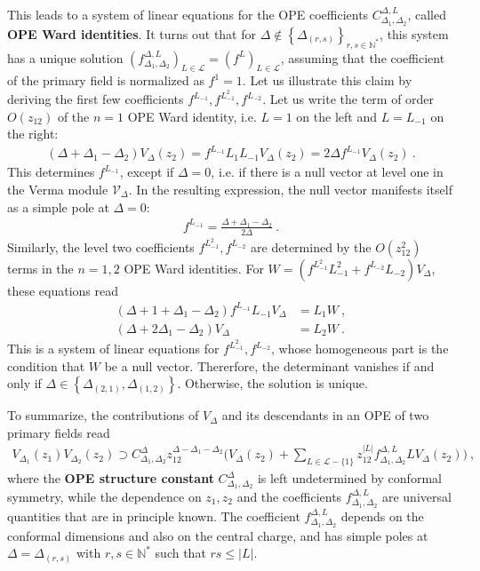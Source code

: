\documentclass[12pt, a4paper]{article}
\theoremstyle{break}
\begin{document}
This leads to a system of linear equations for the OPE coefficients $C^{\Delta,L}_{\Delta_1,\Delta_2}$, called \textbf{OPE Ward identities}. It turns out that for $\Delta\notin \left\{\Delta_{(r,s)}\right\}_{r,s\in\mathbb{N}^*}$, this system has a unique solution $\left(f^{\Delta,L}_{\Delta_1,\Delta_2}\right)_{L\in\mathcal{L}}=\left(f^L\right)_{L\in\mathcal{L}}$, assuming that the coefficient of the primary field is normalized as
$f^{1}=1$. Let us illustrate this claim by deriving the first few coefficients $f^{L_{-1}},f^{L_{-1}^2},f^{L_{-2}}$. Let us write the term of order $O(z_{12})$ of the $n=1$ OPE Ward identity, i.e. $L=1$ on the left and $L=L_{-1}$ on the right:
\begin{align}
 (\Delta+\Delta_1-\Delta_2)V_\Delta(z_2) = f^{L_{-1}} L_1L_{-1}V_\Delta(z_2)=2\Delta f^{L_{-1}}V_\Delta(z_2)\ .
 \label{dddv}
\end{align}
This determines $f^{L_{-1}}$, except if $\Delta=0$, i.e. if there is a null vector at level one in the Verma module $\mathcal{V}_\Delta$. In the resulting expression, the null vector manifests itself as a simple pole at $\Delta=0$:
\begin{align}
 f^{L_{-1}} = \frac{\Delta+\Delta_1-\Delta_2}{2\Delta}\ . 
 \label{fl1}
\end{align}
Similarly, the level two coefficients $f^{L_{-1}^2},f^{L_{-2}}$ are determined by the $O(z_{12}^2)$ terms in the $n=1,2$ OPE Ward identities. For $W = \left(f^{L_{-1}^2}L_{-1}^2 + f^{L_{-2}}L_{-2}\right) V_\Delta$, these equations read 
\begin{align}
 (\Delta+1+\Delta_1-\Delta_2)f^{L_{-1}}L_{-1}V_\Delta  &= L_1W\ ,
 \label{el1c}
 \\
 (\Delta+2\Delta_1-\Delta_2)V_\Delta  &=L_2W \ .
 \label{el2c}
\end{align}
This is a system of linear equations for $f^{L_{-1}^2},f^{L_{-2}}$, whose homogeneous part is the condition that $W$ be a null vector. Thererfore, the determinant vanishes if and only if $\Delta\in \left\{\Delta_{(2,1)},\Delta_{(1,2)}\right\}$. Otherwise, the solution is unique. 

To summarize, the contributions of $V_\Delta$ and its descendants in an OPE of two primary fields read
\begin{align}
 \boxed{V_{\Delta_1}(z_1)V_{\Delta_2}(z_2) \supset  C_{\Delta_1,\Delta_2}^{\Delta} z_{12}^{\Delta-\Delta_1-\Delta_2} \Bigg(V_\Delta(z_2) +\sum_{L\in \mathcal{L}-\{1\}}z_{12}^{|L|} f^{\Delta,L}_{\Delta_1,\Delta_2} LV_\Delta(z_2)\Bigg)}
 \ ,
 \label{prope}
\end{align}
where the \textbf{OPE structure constant} $C^\Delta_{\Delta_1,\Delta_2}$ is left undetermined by conformal symmetry, while the dependence on $z_1,z_2$ and the coefficients $f^{\Delta,L}_{\Delta_1,\Delta_2}$ are universal quantities that are in principle known. The coefficient $f^{\Delta,L}_{\Delta_1,\Delta_2}$ depends on the conformal dimensions and also on the central charge, and has simple poles at $\Delta=\Delta_{(r,s)}$ with $r,s\in\mathbb{N}^*$ such that $rs\leq |L|$. 
\end{document}
